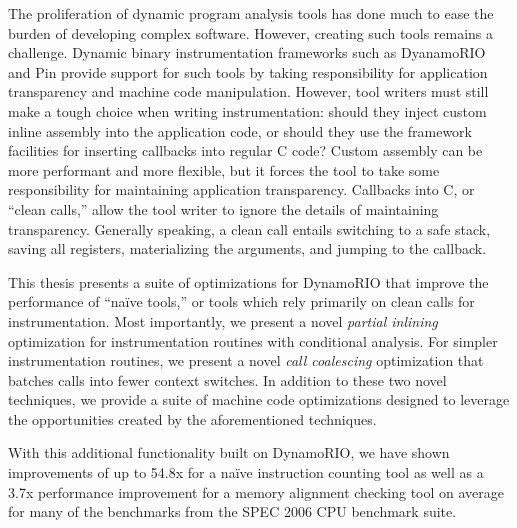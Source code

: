 \begin{abstractpage}

The proliferation of dynamic program analysis tools has done much to ease the
burden of developing complex software.  However, creating such tools remains a
challenge.  Dynamic binary instrumentation frameworks such as DyanamoRIO and
Pin provide support for such tools by taking responsibility for application
transparency and machine code manipulation.  However, tool writers must still
make a tough choice when writing instrumentation: should they inject custom
inline assembly into the application code, or should they use the framework
facilities for inserting callbacks into regular C code?  Custom assembly can be
more performant and more flexible, but it forces the tool to take some
responsibility for maintaining application transparency.  Callbacks into C, or
``clean calls,'' allow the tool writer to ignore the details of maintaining
transparency.  Generally speaking, a clean call entails switching to a safe
stack, saving all registers, materializing the arguments, and jumping to the
callback.

This thesis presents a suite of optimizations for DynamoRIO that improve the
performance of ``na\"ive tools,'' or tools which rely primarily on clean calls
for instrumentation.  Most importantly, we present a novel {\em partial
inlining} optimization for instrumentation routines with conditional analysis.
For simpler instrumentation routines, we present a novel {\em call coalescing}
optimization that batches calls into fewer context switches.  In addition to
these two novel techniques, we provide a suite of machine code optimizations
designed to leverage the opportunities created by the aforementioned techniques.

With this additional functionality built on DynamoRIO, we have shown
improvements of up to 54.8x for a na\"ive instruction counting tool as well as a
3.7x performance improvement for a memory alignment checking tool on average for
many of the benchmarks from the SPEC 2006 CPU benchmark suite.

\end{abstractpage}

